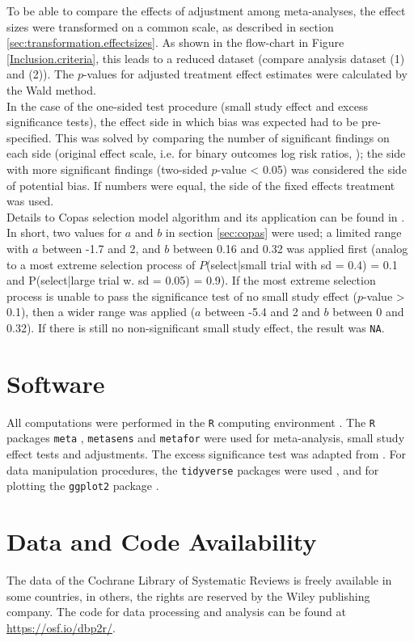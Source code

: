 \documentclass[11pt,a4paper,twoside]{book}\usepackage[]{graphicx}\usepackage[]{color}
\begin{document}
To be able to compare the effects of adjustment among meta-analyses, the effect sizes were transformed on a common scale, as described in section \ref{sec:transformation.effectsizes}. As shown in the flow-chart in Figure \ref{Inclusion.criteria}, this leads to a reduced dataset (compare analysis dataset (1) and (2)). The $p$-values for adjusted treatment effect estimates were calculated by the Wald method. \\
In the case of the one-sided test procedure (small study effect and excess significance tests), the effect side in which bias was expected had to be pre-specified. This was solved by comparing the number of significant findings on each side (original effect scale, i.e. for binary outcomes log risk ratios, \etc); the side with more significant findings (two-sided $p$-value < 0.05) was considered the side of potential bias. If numbers were equal, the side of the fixed effects treatment was used. \\
Details to Copas selection model algorithm and its application can be found in \citet{limitmeta}. In short, two values for $a$ and $b$ in section \ref{sec:copas} were used; a limited range with $a$ between -1.7 and 2, and $b$ between 0.16 and 0.32 was applied first (analog to a most extreme selection process of $P$(select|small trial with sd = 0.4) = 0.1 and P(select|large trial w. sd  = 0.05) = 0.9). If the most extreme selection process is unable to pass the significance test of no small study effect ($p$-value > 0.1), then a wider range was applied ($a$  between -5.4 and 2 and $b$ between 0 and 0.32). If there is still no non-significant small study effect, the result was \texttt{NA}.


\section{Software}
All computations were performed in the \texttt{R} computing environment \citep{R.base}. The \texttt{R} packages \texttt{meta} \citep{meta.package}, \texttt{metasens} \citep{metasens.package} and \texttt{metafor} \citep{metafor.package} were used for meta-analysis, small study effect tests and adjustments. The excess significance test was adapted from \citet{vanAert.2019}. For data manipulation procedures, the \texttt{tidyverse} packages were used \citep{tidyverse.package}, and for plotting the \texttt{ggplot2} package \citep{ggplot2}.\\


\section{Data and Code Availability}
The data of the Cochrane Library of Systematic Reviews is freely available in some countries, in others, the rights are reserved by the Wiley publishing company. The code for data processing and analysis can be found at \url{https://osf.io/dbp2r/}.
\end{document}
